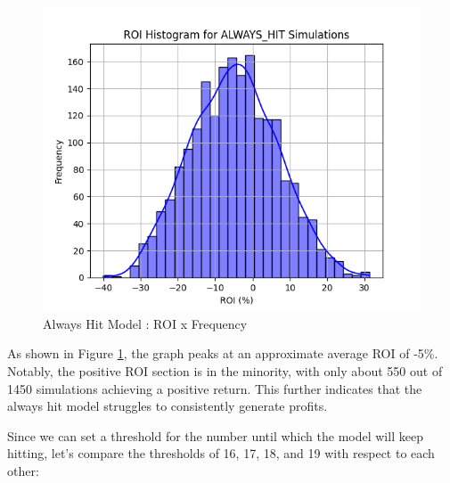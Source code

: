 \documentclass[a4paper,12pt]{report}
\begin{document}
\begin{figure}[h]
\begin{center}
\includegraphics[scale=0.5]{figures/graphs/ah_roi.png}
\end{center}
\caption{Always Hit Model : ROI x Frequency}
\label{fig:ah_roi}
\end{figure}

As shown in Figure \ref{fig:ah_roi}, the graph peaks at an approximate average ROI of -5\%. Notably, the positive ROI section is in the minority, with only about 550 out of 1450 simulations achieving a positive return. This further indicates that the always hit model struggles to consistently generate profits.

Since we can set a threshold for the number until which the model will keep hitting, let's compare the thresholds of 16, 17, 18, and 19 with respect to each other:
\end{document}
